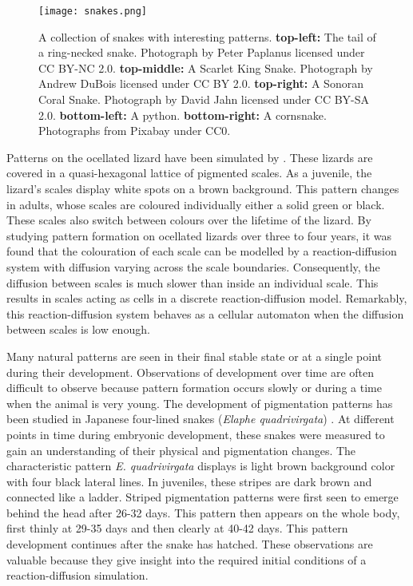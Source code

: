 
\begin{figure}[hb]
	\centering
	\texttt{[image: snakes.png]}
	\caption{A collection of snakes with interesting patterns. \textbf{top-left:} The tail of a ring-necked snake. Photograph by Peter Paplanus licensed under CC BY-NC 2.0. \textbf{top-middle:} A Scarlet King Snake. Photograph by Andrew DuBois licensed under CC BY 2.0. \textbf{top-right:} A Sonoran Coral Snake. Photograph by David Jahn licensed under CC BY-SA 2.0. \textbf{bottom-left:} A python. \textbf{bottom-right:} A cornsnake. Photographs from Pixabay under CC0.}
	\label{fig:realSnakePatterns}
\end{figure}

Patterns on the ocellated lizard have been simulated by \cite{manukyan2017}. These lizards are covered in a quasi-hexagonal lattice of pigmented scales. As a juvenile, the lizard's scales display white spots on a brown background. This pattern changes in adults, whose scales are coloured individually either a solid green or black. These scales also switch between colours over the lifetime of the lizard. By studying pattern formation on ocellated lizards over three to four years, it was found that the colouration of each scale can be modelled by a reaction-diffusion system with diffusion varying across the scale boundaries. Consequently, the diffusion between scales is much slower than inside an individual scale. This results in scales acting as cells in a discrete reaction-diffusion model. Remarkably, this reaction-diffusion system behaves as a cellular automaton when the diffusion between scales is low enough.

Many natural patterns are seen in their final stable state or at a single point during their development. Observations of development over time are often difficult to observe because pattern formation occurs slowly or during a time when the animal is very young. The development of pigmentation patterns has been studied in Japanese four-lined snakes (\textit{Elaphe quadrivirgata}) \cite{murakami2018}. At different points in time during embryonic development, these snakes were measured to gain an understanding of their physical and pigmentation changes. The characteristic pattern \textit{E. quadrivirgata} displays is light brown background color with four black lateral lines. In juveniles, these stripes are dark brown and connected like a ladder. Striped pigmentation patterns were first seen to emerge behind the head after 26-32 days. This pattern then appears on the whole body, first thinly at 29-35 days and then clearly at 40-42 days. This pattern development continues after the snake has hatched. These observations are valuable because they give insight into the required initial conditions of a reaction-diffusion simulation.


